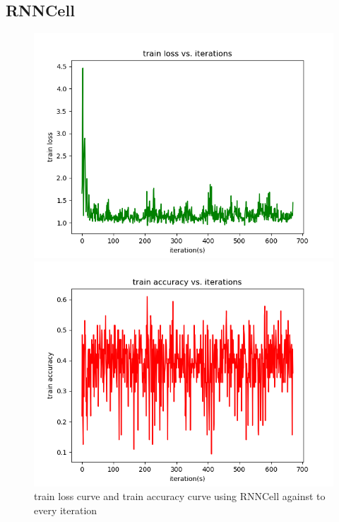 \documentclass{elegantbook}
\begin{document}
\subsection{RNNCell}
\begin{figure}[!h]
	\centering
	\begin{minipage}[t]{0.48\textwidth}
		\centering
		\includegraphics[width=\textwidth]{../codes/trainlossrnncell}
	\end{minipage}
	\begin{minipage}[t]{0.48\textwidth}
		\centering
		\includegraphics[width=\textwidth]{../codes/trainaccrnncell}
	\end{minipage}
	\caption{\label{trainres11}train loss curve and train accuracy curve using RNNCell against to every iteration}
\end{figure}
\end{document}
